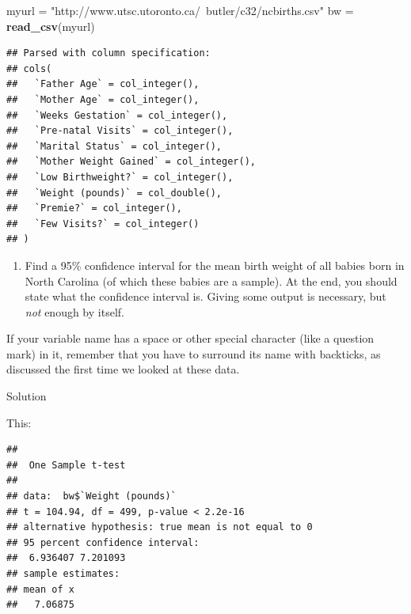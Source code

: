 \documentclass[]{tufte-book}
\newenvironment{Shaded}{}{}
\newcommand{\DataTypeTok}[1]{\textcolor[rgb]{0.56,0.13,0.00}{#1}}
\newcommand{\KeywordTok}[1]{\textcolor[rgb]{0.00,0.44,0.13}{\textbf{#1}}}
\newcommand{\NormalTok}[1]{#1}
\newcommand{\OperatorTok}[1]{\textcolor[rgb]{0.40,0.40,0.40}{#1}}
\newcommand{\StringTok}[1]{\textcolor[rgb]{0.25,0.44,0.63}{#1}}
\providecommand{\tightlist}{%
  \setlength{\itemsep}{0pt}\setlength{\parskip}{0pt}}
\theoremstyle{definition}
\theoremstyle{definition}
\theoremstyle{definition}
\theoremstyle{remark}
\begin{document}
\begin{Shaded}
\begin{Highlighting}[]
\NormalTok{myurl =}\StringTok{ "http://www.utsc.utoronto.ca/~butler/c32/ncbirths.csv"}
\NormalTok{bw =}\StringTok{ }\KeywordTok{read_csv}\NormalTok{(myurl)}
\end{Highlighting}
\end{Shaded}

\begin{verbatim}
## Parsed with column specification:
## cols(
##   `Father Age` = col_integer(),
##   `Mother Age` = col_integer(),
##   `Weeks Gestation` = col_integer(),
##   `Pre-natal Visits` = col_integer(),
##   `Marital Status` = col_integer(),
##   `Mother Weight Gained` = col_integer(),
##   `Low Birthweight?` = col_integer(),
##   `Weight (pounds)` = col_double(),
##   `Premie?` = col_integer(),
##   `Few Visits?` = col_integer()
## )
\end{verbatim}

\begin{enumerate}
\def\labelenumi{(\alph{enumi})}
\setcounter{enumi}{1}
\tightlist
\item
  Find a 95\% confidence interval for the mean birth weight of all
  babies born in North Carolina (of which these babies are a sample). At
  the end, you should state what the confidence interval is. Giving some
  output is necessary, but \emph{not} enough by itself.
\end{enumerate}

If your variable name has a space or other special character (like a
question mark) in it, remember that you have to surround its name with
backticks, as discussed the first time we looked at these data.

Solution

This:

\begin{Shaded}
\end{Shaded}

\begin{verbatim}
## 
##  One Sample t-test
## 
## data:  bw$`Weight (pounds)`
## t = 104.94, df = 499, p-value < 2.2e-16
## alternative hypothesis: true mean is not equal to 0
## 95 percent confidence interval:
##  6.936407 7.201093
## sample estimates:
## mean of x 
##   7.06875
\end{verbatim}
\end{document}
